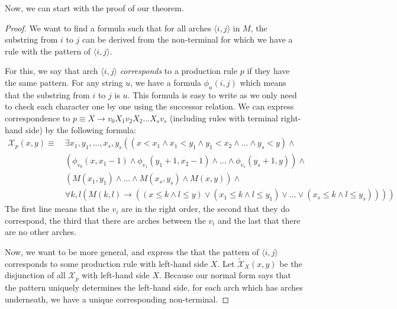 Now, we can start with the proof of our theorem.
\begin{proof}
    We want to find a formula such that for all arches $\langle i, j \rangle$ in $M$, the substring from $i$ to $j$ can be derived from the non-terminal for which we have a rule with the pattern of $\langle i, j \rangle$.

    For this, we say that arch $\langle i, j \rangle$ \emph{corresponds} to a production rule $p$ if they have the same pattern.
    For any string $u$, we have a formula $\phi_u(i, j)$ which means that the substring from $i$ to $j$ is $u$.
    This formula is easy to write as we only need to check each character one by one using the successor relation.
    We can express correspondence to $p \equiv X \to v_{0}X_{1}v_{2}X_{2}\dots X_{s}v_{s}$ (including rules with terminal right-hand side) by the following formula:
    \begin{align*}
        \mathcal{X}_p(x, y) \equiv~&\exists x_1, y_1, \dots, x_s, y_s \left(\left(x < x_1 \land x_1 < y_1 \land y_1 < x_2 \land \dots \land y_s < y \right) \land \right. \\
        &\left. \left(\phi_{v_0}(x, x_1 - 1) \land \phi_{v_1}(y_1 + 1, x_2 - 1) \land \dots \land \phi_{v_s}(y_s + 1, y)\right) \land \right. \\
        &\left. \left(M(x_1, y_1) \land \dots \land M(x_s, y_s) \land M(x, y) \right) \land \right. \\
        &\left. \forall k, l \left(M(k, l) \to \left((x \leq k \land l \leq y) \lor (x_1 \leq k \land l \leq y_1) \lor \dots \lor (x_s \leq k \land l \leq y_s)\right)\right) \right)
    \end{align*}
    The first line means that the $v_i$ are in the right order, the second that they do correspond, the third that there are arches between the $v_i$ and the last that there are no other arches.

    Now, we want to be more general, and express the that the pattern of $\langle i, j \rangle$ corresponds to some production rule with left-hand side $X$.
    Let $\widetilde{\mathcal{X}}_X(x, y)$ be the disjunction of all $\mathcal{X}_p$ with left-hand side $X$.
    Because our normal form says that the pattern uniquely determines the left-hand side, for each arch which has arches underneath, we have a unique corresponding non-terminal.


\end{proof}
